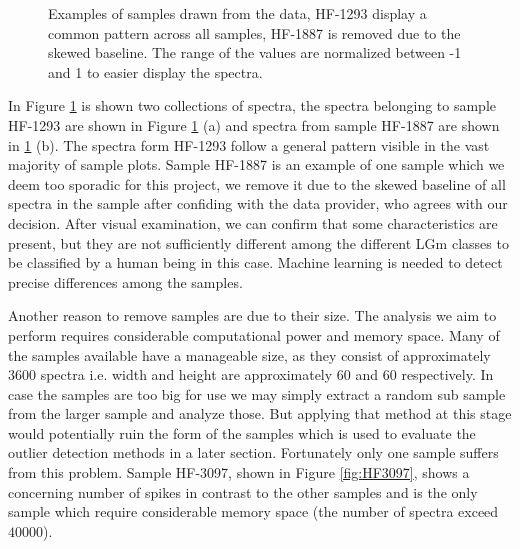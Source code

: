 \begin{figure}[h]

    \centering
    \qquad
    \caption{Examples of samples drawn from the data, HF-1293 display a common pattern across all samples, HF-1887 is removed due to the skewed baseline. The range of the values are normalized between -1 and 1 to easier display the spectra.
    \label{fig:spectrum}}%
\end{figure}

In Figure \ref{fig:spectrum} is shown two collections of spectra, the spectra belonging to sample HF-1293 are shown in Figure \ref{fig:spectrum} (a) and spectra from sample HF-1887 are shown in \ref{fig:spectrum} (b). The spectra form HF-1293 follow a general pattern visible in the vast majority of sample plots.
Sample HF-1887 is an example of one sample which we deem too sporadic for this project, we remove it due to the skewed baseline of all spectra in the sample after confiding with the data provider, who agrees with our decision. After visual examination, we can confirm that some characteristics are present, but they are not sufficiently different among the different LGm classes to be classified by a human being in this case. Machine learning is needed to detect precise differences    among the samples.

Another reason to remove samples are due to their size. The analysis we aim to perform requires considerable computational power and memory space. Many of the samples available have a manageable size, as they consist of approximately $3600$ spectra i.e. width and height are approximately $60$ and $60$ respectively. In case the samples are too big for use we may simply extract a random sub sample from the larger sample and analyze those. But applying that method at this stage would potentially ruin the form of the samples which is used to evaluate the outlier detection methods in a later section. Fortunately only one sample suffers from this problem. Sample HF-3097, shown in Figure \ref{fig:HF3097}, shows a concerning number of spikes in contrast to the other samples and is the only sample which require considerable memory space (the number of spectra exceed $40000$).

